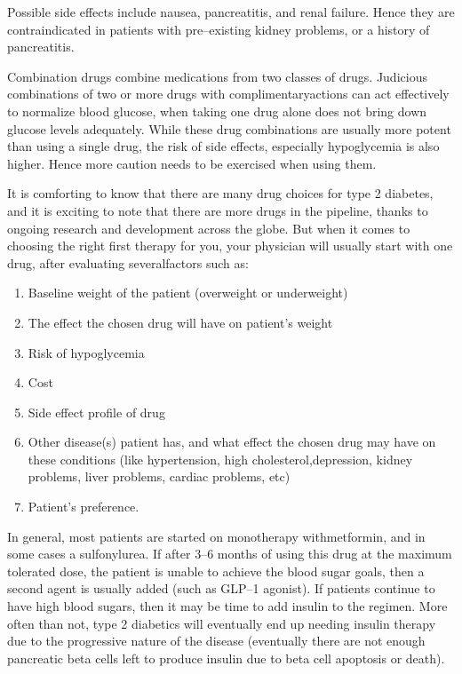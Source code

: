 \newpage

Possible side effects include nausea, pancreatitis, and renal failure. Hence they are contraindicated in patients with pre–existing kidney problems, or a history of pancreatitis.


Combination drugs combine medications from two classes of drugs. Judicious combinations of two or more drugs with complimentary\break actions can act effectively to normalize blood glucose, when taking one drug alone does not bring down glucose levels adequately. While these drug combinations are usually more potent than using a single drug, the risk of side effects, especially hypoglycemia is also higher. Hence more caution needs to be exercised when using them.


It is comforting to know that there are many drug choices for type 2 diabetes, and it is exciting to note that there are more drugs in the pipeline, thanks to ongoing research and development across the globe. But when it comes to choosing the right first therapy for you, your physician will usually start with one drug, after evaluating several\break factors such as:

\begin{enumerate}[•]
\itemsep=0pt
\item Baseline weight of the patient (overweight or underweight)
\item The effect the chosen drug will have on patient’s weight
\item Risk of hypoglycemia
\item Cost
\item Side effect profile of drug
\item Other disease(s) patient has, and what effect the chosen drug may have on these conditions (like hypertension, high cholesterol,\break depression, kidney problems, liver problems, cardiac problems, etc)
\item Patient’s preference.
\end{enumerate}

In general, most patients are started on monotherapy with\break metformin, and in some cases a sulfonylurea. If after 3–6 months of using this drug at the maximum tolerated dose, the patient is unable to achieve the blood sugar goals, then a second agent is usually added (such as GLP–1 agonist). If patients continue to have high blood sugars, then it may be time to add insulin to the regimen. More often than not, type 2 diabetics will eventually end up needing insulin therapy due to the progressive nature of the disease (eventually there are not enough pancreatic beta cells left to produce insulin due to beta cell apoptosis or death).

